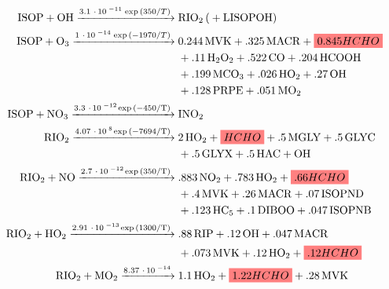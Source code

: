     
    \begin{subequations}
      \label{Model:GC:mechanisms:eqn_mechanisms}
      \begin{align} %
      \ce{
        ISOP + OH ->[3.1*10^{-11} \exp{(350/T})] 
        & RIO2 ( + LISOPOH) \label{mech1}  \\ 
        ISOP + O3 ->[1*10^{-14} \exp{(-1970/T})] 
        & 0.244MVK + .325MACR + \highlight{0.845HCHO} \notag \\
        & + .11H2O2 + .522CO + .204HCOOH \notag \\
        & + .199MCO3 +.026HO2 + .27OH \notag \\
        & + .128PRPE + .051MO2  \label{mech2} \\ 
        ISOP + NO3 ->[3.3*10^{-12} \exp{(-450/T)}] 
        & INO2 \label{mech3} \\
        RIO2 ->[4.07*10^{8} \exp{(-7694/T)}] 
        & 2HO2 + \highlight{HCHO} + .5MGLY + .5GLYC \notag \\
        & + .5GLYX + .5HAC + OH \label{mech4} \\
        RIO2 + NO ->[2.7*10^{-12} \exp{(350/T)}] 
        & .883NO2 + .783HO2 + \highlight{.66HCHO} \notag \\
        & + .4MVK + .26MACR + .07ISOPND \notag \\
        & + .123HC5 + .1DIBOO + .047ISOPNB \label{mech5} \\
        RIO2 + HO2 ->[2.91*10^{-13} \exp{(1300/T)}] 
        & .88RIP + .12OH + .047 MACR \notag \\
        & + .073MVK + .12HO2 + \highlight{.12HCHO} \label{mech6} \\
        RIO2 + MO2 ->[8.37*10^{-14}] 
        & 1.1HO2 + \highlight{1.22HCHO} + .28MVK  \notag\\
}
\end{align}
\end{subequations}
